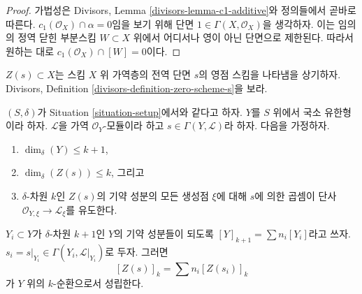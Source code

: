 \begin{proof}
가법성은 Divisors, Lemma \ref{divisors-lemma-c1-additive}와 정의들에서
곧바로 따른다. $c_1(\mathcal{O}_X) \cap \alpha = 0$임을 보기 위해 단면
$1 \in \Gamma(X, \mathcal{O}_X)$을 생각하자. 이는 임의의 정역 닫힌
부분스킴 $W \subset X$ 위에서 어디서나 영이 아닌 단면으로 제한된다.
따라서 원하는 대로 $c_1(\mathcal{O}_X) \cap [W] = 0$이다.
\end{proof}

\noindent
$Z(s) \subset X$는 스킴 $X$ 위 가역층의 전역 단면 $s$의 영점 스킴을
나타냄을 상기하자. Divisors, Definition
\ref{divisors-definition-zero-scheme-s}을 보라.

\begin{lemma}
\label{lemma-prepare-geometric-cap}
$(S, \delta)$가 Situation \ref{situation-setup}에서와 같다고 하자.
$Y$를 $S$ 위에서 국소 유한형이라 하자. $\mathcal{L}$을 가역
$\mathcal{O}_Y$-모듈이라 하고 $s \in \Gamma(Y, \mathcal{L})$라 하자.
다음을 가정하자.
\begin{enumerate}
\item $\dim_\delta(Y) \leq k + 1$,
\item $\dim_\delta(Z(s)) \leq k$, 그리고
\item $\delta$-차원 $k$인 $Z(s)$의 기약 성분의 모든 생성점 $\xi$에
대해 $s$에 의한 곱셈이 단사
$\mathcal{O}_{Y, \xi} \to \mathcal{L}_\xi$를 유도한다.
\end{enumerate}
$Y_i \subset Y$가 $\delta$-차원 $k + 1$인 $Y$의 기약 성분들이 되도록
$[Y]_{k + 1} = \sum n_i[Y_i]$라고 쓰자.
$s_i = s|_{Y_i} \in \Gamma(Y_i, \mathcal{L}|_{Y_i})$로 두자. 그러면
\begin{equation}
\label{equation-equal-as-cycles}
[Z(s)]_k =  \sum n_i[Z(s_i)]_k
\end{equation}
가 $Y$ 위의 $k$-순환으로서 성립한다.
\end{lemma}

